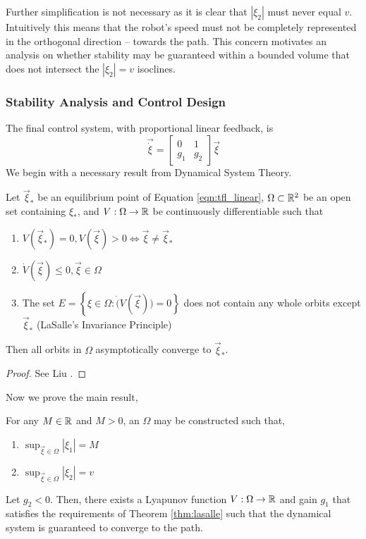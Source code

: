 \documentclass[oneside, 11pt]{book}
\begin{document}
Further simplification is not necessary as it is clear that $\left|\xi_2\right|$ must never equal $v$. Intuitively this means that the robot's speed must not be completely represented in the orthogonal direction -- towards the path. This concern motivates an analysis on whether stability may be guaranteed within a bounded volume that does not intersect the $\left|\xi_2\right|=v$ isoclines.

\subsubsection{Stability Analysis and Control Design}
The final control system, with proportional linear feedback, is
\begin{equation}
    \vec{\dot{\xi}} =   \begin{bmatrix}
                            0 & 1 \\
                            g_1 & g_2
                        \end{bmatrix}
                        \vec{\xi}
    \label{eqn:tfl_linear}
\end{equation}
We begin with a necessary result from Dynamical System Theory.
\begin{theorem}
    Let $\vec{\xi}_*$ be an equilibrium point of Equation \ref{eqn:tfl_linear}, $\Omega\subset\mathbb{R}^2$ be an open set containing $\xi_*$, and $V:\Omega\to\mathbb{R}$ be continuously differentiable such that
    \begin{enumerate}
        \item $V(\vec{\xi}_*) = 0, V(\vec{\xi}) > 0 \Leftrightarrow \vec{\xi}\neq\vec{\xi}_*$
        \item $\dot{V}(\vec{\xi})\leq 0, \vec{\xi}\in\Omega$
        \item The set $E = \left\{ \xi \in \Omega : \dot(V(\vec{\xi})) = 0 \right\}$ does not contain any whole orbits except $\vec{\xi}_*$ (LaSalle's Invariance Principle)
    \end{enumerate}
    Then all orbits in $\Omega$ asymptotically converge to $\vec{\xi}_*$.
    \label{thm:lasalle}
\end{theorem}
\begin{proof}
    See Liu \cite{Liu12}.
\end{proof}
Now we prove the main result,
\begin{theorem}
    For any $M\in\mathbb{R}$ and $M>0$, an $\Omega$ may be constructed such that,
    \begin{enumerate}
        \item $\sup_{\vec{\xi}\in\Omega}{\left|\xi_1\right|} = M$
        \item $\sup_{\vec{\xi}\in\Omega}{\left|\xi_2\right|} = v$
    \end{enumerate}
    Let $g_2 < 0$. Then, there exists a Lyapunov function $V:\Omega\to\mathbb{R}$ and gain $g_1$ that satisfies the requirements of Theorem \ref{thm:lasalle} such that the dynamical system is guaranteed to converge to the path.
    \label{thm:sf_stability}
\end{theorem}
\end{document}
